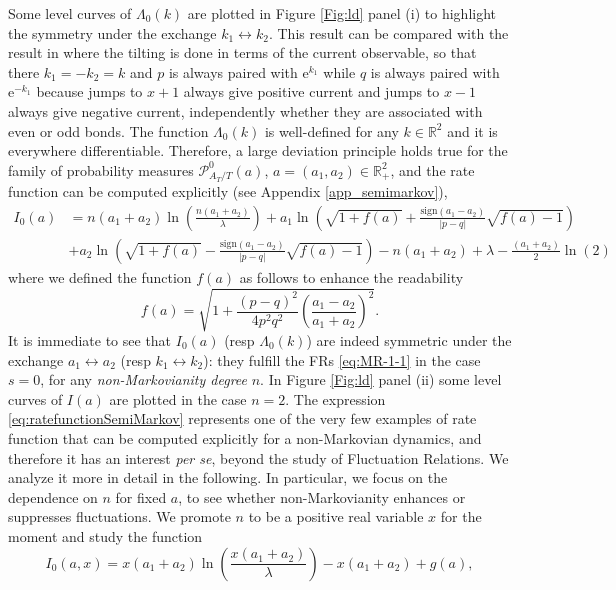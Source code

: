 \documentclass[a4paper,11pt]{article}
\numberwithin{equation}{section}
\begin{document}
Some level curves of $\Lambda_0(k)$ are plotted in Figure \ref{Fig:ld} panel (i) to highlight the symmetry under the exchange $k_1 \leftrightarrow k_2$.
This result can be compared with the result in \cite{MNW09} where the tilting is done in terms of the current observable, so that there $k_1=-k_2=k$ and $p$ is always paired with $\mathrm{e}^{k_1}$ while $q$ is always paired with $\mathrm{e}^{-k_1}$ because jumps to $x+1$ always give positive current and jumps to $x-1$ always give negative current, independently whether they are associated with even or odd bonds. The function $\Lambda_0(k)$ is well-defined for any $k \in \mathbb{R}^2$ and it is everywhere differentiable. Therefore, a large deviation principle holds true for the family of probability measures $\mathcal{P}_{A_T/T}^0(a)$, $a = (a_1,a_2) \in \mathbb{R}_+^2$, and the rate function can be computed explicitly (see Appendix \ref{app_semimarkov}),
\begin{align}\label{eq:ratefunctionSemiMarkov}
    I_0(a) &= n(a_1 + a_2)  \ln \left(\frac{n (a_1+a_2)}{\lambda}\right)  + a_1 \ln\left( \sqrt{1 + f(a)} + \frac{\mathrm{sign}(a_1-a_2)}{|p-q|}\sqrt{ f(a)-1} \right) \nonumber\\
    &+a_2 \ln\left( \sqrt{1 + f(a)} - \frac{\mathrm{sign}(a_1-a_2)}{|p-q|}\sqrt{ f(a)-1} \right) - n (a_1 + a_2) + \lambda - \frac{(a_1+a_2)}{2}\ln(2)
\end{align}
where we defined the function $f(a)$ as follows to enhance the readability
\begin{equation}
    f(a)= \sqrt{1 + \frac{(p-q)^2}{4 p^2 q^2}\left(\frac{a_1-a_2}{a_1+a_2} \right)^2 }.
\end{equation}
It is immediate to see that $I_0(a)$ (resp $\Lambda_0(k)$) are  indeed symmetric under the exchange $a_1 \leftrightarrow a_2$ (resp $k_1 \leftrightarrow k_2$):  they fulfill the FRs \eqref{eq:MR-1-1} in the case $s=0$, for any \emph{non-Markovianity degree} $n$. In Figure \ref{Fig:ld} panel (ii) some level curves of $I(a)$ are plotted in the case $n=2$. The expression \eqref{eq:ratefunctionSemiMarkov} represents one of the very few examples of rate function that can be computed explicitly for a non-Markovian dynamics, and therefore it has an interest \emph{per se}, beyond the study of Fluctuation Relations. We analyze it more in detail in the following. In particular, we focus on the dependence on $n$ for fixed $a$, to see whether non-Markovianity enhances or suppresses fluctuations. We promote $n$ to be a positive real variable $x$ for the moment and study the function 
\begin{equation}
    I_0(a,x) = x (a_1+a_2) \ln \left(\frac{x (a_1+a_2)}{\lambda}\right) - x (a_1 + a_2) + g(a),
\end{equation}
\end{document}
